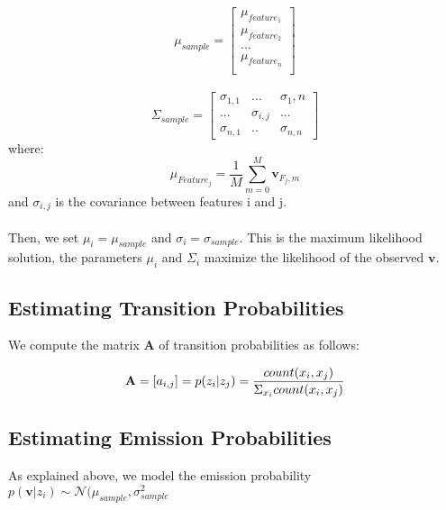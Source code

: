\documentclass[10pt,a4paper]{report}
\begin{document}
\begin{equation}
\mu_{sample} = \begin{bmatrix}
							\mu_{feature_1}\\
							\mu_{feature_2}\\
							...\\
							\mu_{feature_n}\\
							\end{bmatrix}
\end{equation}
\\
\begin{equation}
\Sigma_{sample} = \begin{bmatrix}
								\sigma_{1,1} & ...& \sigma{_1, n}\\
								... & \sigma_{i,j} & ...\\
								\sigma_{n, 1} & .. & \sigma_{n, n}
								\end{bmatrix}
\end{equation}
where: 
$$ \mu_{Feature_{j}} = \frac{1}{M} \sum_{m=0}^{M} \textbf{v}_{F_{j}, m} $$
and 
$ \sigma_{i, j} $ is the covariance between features {i} and {j}.
\\\\
Then, we set $\mu_{i} = \mu_{sample}$ and $\sigma_{i} = \sigma_{sample}$. 
This is the maximum likelihood solution, the parameters $\mu_{i}$ and $\Sigma_{i}$ maximize the likelihood of the observed $\textbf{v}$.

\subsection*{Estimating Transition Probabilities}
We compute the matrix $\textbf{A}$ of transition probabilities as follows:

\begin{equation}
\textbf{A}  = [a_{i,j}] \\
					= p(z_i | z_j) \\
					= \frac{count(x_i, x_j)}{\Sigma_{x_i} count(x_i, x_j)}
\end{equation}

\subsection*{Estimating Emission Probabilities}
As explained above, we model the emission probability $p(\textbf{v} | z_i ) \sim \mathcal{N}(\mu_{sample}, \sigma^2_{sample}$
\end{document}
